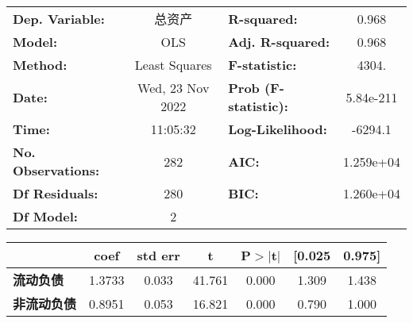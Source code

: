 \begin{center}
\begin{tabular}{lclc}
\toprule
\textbf{Dep. Variable:}    &       总资产        & \textbf{  R-squared:}      &     0.968   \\
\textbf{Model:}            &       OLS        & \textbf{  Adj. R-squared:} &     0.968   \\
\textbf{Method:}           &  Least Squares   & \textbf{  F-statistic:       }          &     4304.   \\
\textbf{Date:}             & Wed, 23 Nov 2022 & \textbf{  Prob (F-statistic):}          & 5.84e-211   \\
\textbf{Time:}             &     11:05:32     & \textbf{  Log-Likelihood:    }          &   -6294.1   \\
\textbf{No. Observations:} &         282      & \textbf{  AIC:               }          & 1.259e+04   \\
\textbf{Df Residuals:}     &         280      & \textbf{  BIC:               }          & 1.260e+04   \\
\textbf{Df Model:}         &           2      & \textbf{                     }          &             \\
\bottomrule
\end{tabular}
\begin{tabular}{lcccccc}
               & \textbf{coef} & \textbf{std err} & \textbf{t} & \textbf{P$> |$t$|$} & \textbf{[0.025} & \textbf{0.975]}  \\
\midrule
\textbf{流动负债}  &       1.3733  &        0.033     &    41.761  &         0.000        &        1.309    &        1.438     \\
\textbf{非流动负债} &       0.8951  &        0.053     &    16.821  &         0.000        &        0.790    &        1.000     \\
\bottomrule
\end{tabular}
\end{center}
